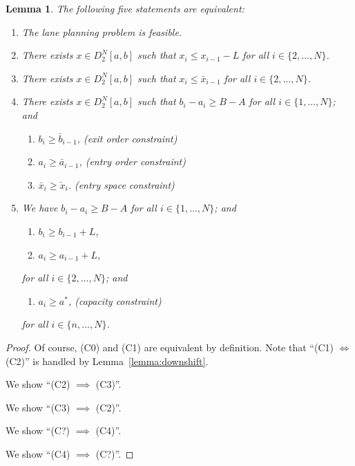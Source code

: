 \documentclass[a4paper]{article}
\theoremstyle{definition}
\theoremstyle{plain}
\newtheorem{lemma}{Lemma\hspace{0.25em}\ignorespaces}
\begin{document}
\begin{lemma}
  The following five statements are equivalent:

  \begin{enumerate}[leftmargin=3em]
    \item[(C0)] The lane planning problem is feasible.
    \item[(C1)] There exists $x \in D_{2}^{N}[a, b]$ such that $x_{i} \leq x_{i-1} - L$ for all $i \in \{2, \dots, N\}$.
    \item[(C2)] There exists $x \in D_{2}^{N}[a, b]$ such that $x_{i} \leq \bar{x}_{i-1}$ for all $i \in \{2, \dots, N\}$.

    \item[(C3)] There exists $x \in D_{2}^{N}[a, b]$ such that
          $b_{i} - a_{i} \geq B - A$ for all $i \in \{1, \dots, N\}$; and
    \TabPositions{2cm}
    \begin{enumerate}[label=(\roman*)\quad,leftmargin=3em,midpenalty=10]
      \item $b_{i} \geq \bar{b}_{i-1}$, \tab (exit order constraint)
      \item $a_{i} \geq \bar{a}_{i-1}$, \tab (entry order constraint)
      \item $\bar{x}_{i} \geq \check{x}_{i}$. \tab (entry space constraint)
    \end{enumerate}

    \item[(C4)] We have $b_{i} - a_{i} \geq B-A$ for all $i \in \{1, \dots, N\}$; and
    \begin{enumerate}[leftmargin=4em,midpenalty=10]
      \item[(ii*)\quad] $b_{i} \geq b_{i-1} + L$,
      \item[(iii*)\quad] $a_{i} \geq a_{i-1} + L$,
    \end{enumerate}
    for all $i \in \{2, \dots, N\}$; and
    \begin{enumerate}[leftmargin=4em,midpenalty=10]
      \item[(c*)\quad] $a_{i} \geq a^{*}$, \tab (capacity constraint)
    \end{enumerate}
    for all $i \in \{n, \dots, N \}$.
  \end{enumerate}
\end{lemma}
\begin{proof}
  Of course, (C0) and (C1) are equivalent by definition. Note that ``(C1) $\iff$
  (C2)'' is handled by Lemma~\ref{lemma:downshift}.

  We show ``(C2) $\implies$ (C3)''.

  We show ``(C3) $\implies$ (C2)''.

  We show ``(C?) $\implies$ (C4)''.

  We show ``(C4) $\implies$ (C?)''.
\end{proof}
\end{document}
